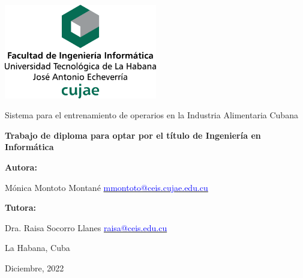 \begin{titlepage}

\centering

{\includegraphics[width=0.5\textwidth]{imagen/cujae}\par}

\vspace{3.5cm}

{\LARGE Sistema para el entrenamiento de operarios en la Industria Alimentaria Cubana\par}
\vspace{1cm}

{\bfseries\Large Trabajo de diploma para optar por el título de Ingeniería en Informática\par}
\vspace{2.5cm}

{\bfseries\Large Autora:} { \Large Mónica Montoto Montané \break \href{mailto:mmontoto@ceis.cujae.edu.cu}{\textcolor{blue}{mmontoto@ceis.cujae.edu.cu}}
\par}
{\bfseries\Large Tutora: }{\Large Dra. Raisa Socorro Llanes \break
\href{mailto:raisa@ceis.edu.cu}{\textcolor{blue}{raisa@ceis.edu.cu}} \par}
\vfill

{\Large La Habana, Cuba \par}

\large{Diciembre, 2022}

\end{titlepage}


